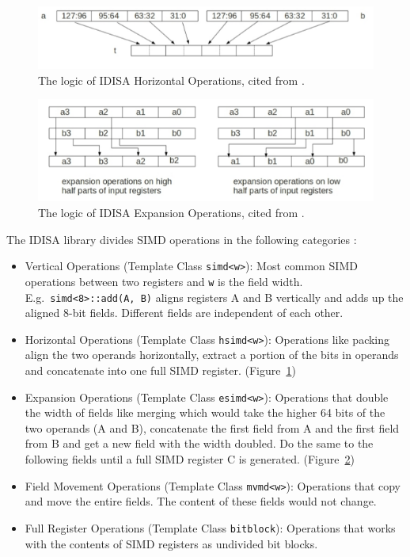 \begin{figure}[ht!]
\centering
\includegraphics[width=130mm]{draw/horizontal.png}
\caption[Horizontal Operations in IDISA]{The logic of IDISA Horizontal Operations, cited from \cite{hua_idisa}.}
\label{figure:horizontal}
\end{figure}

\begin{figure}[ht!]
\centering
\includegraphics[width=130mm]{draw/expansion.png}
\caption[Expansion Operations in IDISA]{The logic of IDISA Expansion Operations, cited from \cite{hua_idisa}.}
\label{figure:expansion}
\end{figure}

The IDISA library divides SIMD operations in the following categories \cite{idisa_webpage}:
\begin{itemize}
    \item Vertical Operations (Template Class {\tt simd<w>}): Most common SIMD operations between two registers and {\tt w} is the field width. E.g.\ {\tt simd<8>::add(A, B)} aligns registers A and B vertically and adds up the aligned 8-bit fields. Different fields are independent of each other.
    \item Horizontal Operations (Template Class {\tt hsimd<w>}): Operations like packing align the two operands horizontally, extract a portion of the bits in operands and concatenate into one full SIMD register. (Figure~\ref{figure:horizontal})
    \item Expansion Operations (Template Class {\tt esimd<w>}): Operations that double the width of fields like merging which would take the higher 64 bits of the two operands (A and B), concatenate the first field from A and the first field from B and get a new field with the width doubled. Do the same to the following fields until a full SIMD register C is generated. (Figure~\ref{figure:expansion})
    \item Field Movement Operations (Template Class {\tt mvmd<w>}): Operations that copy and move the entire fields. The content of these fields would not change.
    \item Full Register Operations (Template Class {\tt bitblock}): Operations that works with the contents of SIMD registers as undivided bit blocks.
\end{itemize}


